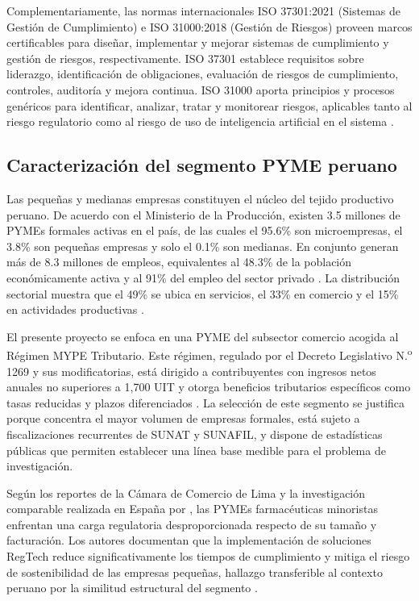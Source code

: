 \documentclass[12pt,a4paper,oneside]{report}
\begin{document}
Complementariamente, las normas internacionales ISO 37301:2021 (Sistemas de Gestión de Cumplimiento) e ISO 31000:2018 (Gestión de Riesgos) proveen marcos certificables para diseñar, implementar y mejorar sistemas de cumplimiento y gestión de riesgos, respectivamente. ISO 37301 establece requisitos sobre liderazgo, identificación de obligaciones, evaluación de riesgos de cumplimiento, controles, auditoría y mejora continua. ISO 31000 aporta principios y procesos genéricos para identificar, analizar, tratar y monitorear riesgos, aplicables tanto al riesgo regulatorio como al riesgo de uso de inteligencia artificial en el sistema \parencite{iso37301,iso31000}.

\subsection{Caracterización del segmento PYME peruano}\label{subsec:caracterizacion-pyme-peruano}

Las pequeñas y medianas empresas constituyen el núcleo del tejido productivo peruano. De acuerdo con el Ministerio de la Producción, existen 3.5 millones de PYMEs formales activas en el país, de las cuales el 95.6\% son microempresas, el 3.8\% son pequeñas empresas y solo el 0.1\% son medianas. En conjunto generan más de 8.3 millones de empleos, equivalentes al 48.3\% de la población económicamente activa y al 91\% del empleo del sector privado \parencite{produce2022}. La distribución sectorial muestra que el 49\% se ubica en servicios, el 33\% en comercio y el 15\% en actividades productivas \parencite{inei2024}.

El presente proyecto se enfoca en una PYME del subsector comercio acogida al Régimen MYPE Tributario. Este régimen, regulado por el Decreto Legislativo N.\textsuperscript{o} 1269 y sus modificatorias, está dirigido a contribuyentes con ingresos netos anuales no superiores a 1,700 UIT y otorga beneficios tributarios específicos como tasas reducidas y plazos diferenciados \parencite{decreto1269}. La selección de este segmento se justifica porque concentra el mayor volumen de empresas formales, está sujeto a fiscalizaciones recurrentes de SUNAT y SUNAFIL, y dispone de estadísticas públicas que permiten establecer una línea base medible para el problema de investigación.

Según los reportes de la Cámara de Comercio de Lima y la investigación comparable realizada en España por \textcite{cruzrambaud2022}, las PYMEs farmacéuticas minoristas enfrentan una carga regulatoria desproporcionada respecto de su tamaño y facturación. Los autores documentan que la implementación de soluciones RegTech reduce significativamente los tiempos de cumplimiento y mitiga el riesgo de sostenibilidad de las empresas pequeñas, hallazgo transferible al contexto peruano por la similitud estructural del segmento \parencite{camaradecomerciodelima2025}.
\end{document}
